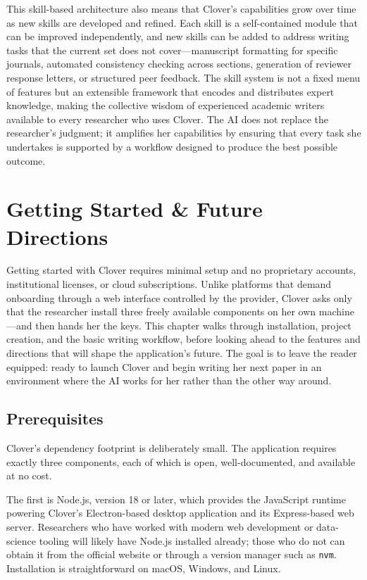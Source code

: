 \documentclass[a4paper,11pt]{article}
\begin{document}
This skill-based architecture also means that Clover's capabilities grow over time as new skills are developed and refined. Each skill is a self-contained module that can be improved independently, and new skills can be added to address writing tasks that the current set does not cover---manuscript formatting for specific journals, automated consistency checking across sections, generation of reviewer response letters, or structured peer feedback. The skill system is not a fixed menu of features but an extensible framework that encodes and distributes expert knowledge, making the collective wisdom of experienced academic writers available to every researcher who uses Clover. The AI does not replace the researcher's judgment; it amplifies her capabilities by ensuring that every task she undertakes is supported by a workflow designed to produce the best possible outcome.

\newpage

\section{Getting Started \& Future Directions}
\label{sec:getting-started}

Getting started with Clover requires minimal setup and no proprietary accounts, institutional licenses, or cloud subscriptions. Unlike platforms that demand onboarding through a web interface controlled by the provider, Clover asks only that the researcher install three freely available components on her own machine---and then hands her the keys. This chapter walks through installation, project creation, and the basic writing workflow, before looking ahead to the features and directions that will shape the application's future. The goal is to leave the reader equipped: ready to launch Clover and begin writing her next paper in an environment where the AI works for her rather than the other way around.

\subsection{Prerequisites}

Clover's dependency footprint is deliberately small. The application requires exactly three components, each of which is open, well-documented, and available at no cost.

The first is Node.js, version 18 or later, which provides the JavaScript runtime powering Clover's Electron-based desktop application and its Express-based web server. Researchers who have worked with modern web development or data-science tooling will likely have Node.js installed already; those who do not can obtain it from the official website or through a version manager such as \texttt{nvm}. Installation is straightforward on macOS, Windows, and Linux.
\end{document}
